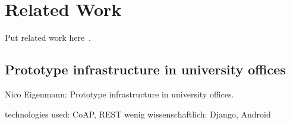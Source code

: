 
\chapter{Related Work}
\label{sec:relatedwork}

Put related work here~\cite{mattern2010ict}.

\section{Prototype infrastructure in university offices}
Nico Eigenmann: Prototype infrastructure in university offices\cite{eigenmann2012opportunisticSensing}.


technologies used:
CoAP, REST
wenig wissenschaftlich: Django, Android